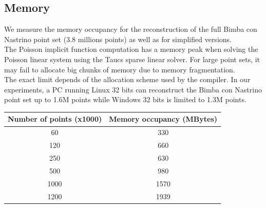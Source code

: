 \subsection{Memory}

We measure the memory occupancy for the reconstruction of the full Bimba con Nastrino point set (3.8 millions points) as well as for simplified versions.\\
The Poisson implicit function computation has a memory peak when solving the Poisson linear system using the {\sc Taucs} sparse linear solver. For large point sets, it may fail to allocate big chunks of memory due to memory fragmentation.\\
The exact limit depends of the allocation scheme used by the compiler. In our experiments, a PC running Linux 32 bits can reconstruct the Bimba con Nastrino point set up to 1.6M points while Windows 32 bits is limited to 1.3M points.\\

\begin{tabular}{|c|c|}
  \hline
  Number of points (x1000) & Memory occupancy (MBytes) \\
  \hline
  60                         & 330 \\
  120                        & 660 \\
  250                        & 630 \\
  500                        & 980 \\
  1000                       & 1570 \\
  1200                       & 1939 \\
  \hline
\end{tabular}

